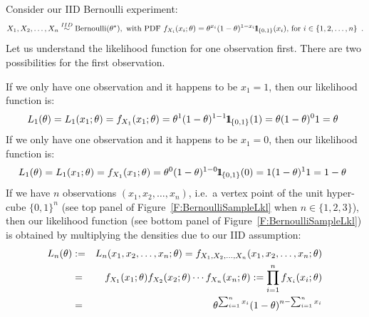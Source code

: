 \begin{example}\label{EX:LklCoinTossing}
{\rm
Consider our IID Bernoulli experiment:
$$
X_1,X_2,\ldots,X_n \overset{IID}{\sim} \mbox{{\rm Bernoulli}}(\theta^*), \text{ with PDF } f_{X_i}(x_i;\theta)=\theta^{x_i}(1-\theta)^{1-x_i} {1}\mspace{-11 mu}{1}_{\{0,1\}}(x_i), \, \text{for } i \in \{1,2,\ldots,n\} \enspace .
$$
Let us understand the likelihood function for one observation first.  There are two possibilities for the first observation.  

If we only have one observation and it happens to be $x_1=1$, then our likelihood function is:
$$L_1(\theta)=L_1(x_1;\theta)
= f_{X_1}(x_1;\theta)
=\theta^{1}(1-\theta)^{1-1} {1}\mspace{-11 mu}{1}_{\{0,1\}}(1)
=\theta (1-\theta)^0 1
=\theta \enspace
$$
If we only have one observation and it happens to be $x_1=0$, then our likelihood function is:
$$L_1(\theta)=L_1(x_1;\theta)
= f_{X_1}(x_1;\theta)
=\theta^{0}(1-\theta)^{1-0} {1}\mspace{-11 mu}{1}_{\{0,1\}}(0)
=1 (1-\theta)^1 1
=1-\theta \enspace
$$
If we have $n$ observations $(x_1,x_2,\ldots,x_n)$, i.e.~a vertex point of the unit hyper-cube $\{0,1\}^n$ (see top panel of Figure~\ref{F:BernoulliSampleLkl} when $n \in \{1,2,3\}$), then our likelihood function (see bottom panel of Figure~\ref{F:BernoulliSampleLkl}) is obtained by multiplying the densities due to our IID assumption:
\begin{eqnarray}\label{E:LklBernoulli}
L_n(\theta) &:=& L_n(x_1,x_2,\ldots,x_n; \theta)  = f_{X_1,X_2,\ldots,X_n}(x_1,x_2,\ldots,x_n ; \theta) \notag \\
&=& f_{X_1}(x_1 ; \theta) f_{X_2}(x_2 ; \theta) \cdots f_{X_n}(x_n ; \theta) := \prod_{i=1}^n f_{X_i}(x_i ; \theta) \notag \\
&=& \theta^{\sum_{i=1}^n x_i} (1-\theta)^ {n-\sum_{i=1}^n x_i} %
\end{eqnarray}
}
\end{example}

